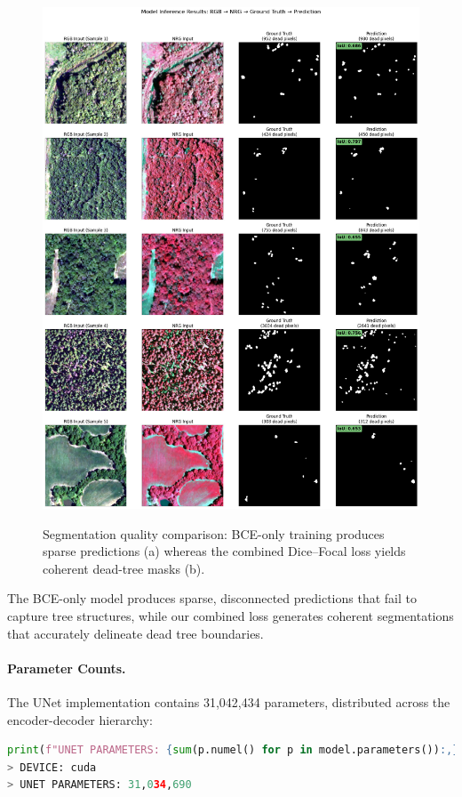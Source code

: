 \begin{figure}[htbp]
\begin{minipage}{0.47\linewidth}
    \includegraphics[width=0.9\linewidth]{figs/unet-good-result-grid.jpg}
    \label{fig:good}
  \end{minipage}
  \caption{Segmentation quality comparison: BCE-only training produces sparse predictions (a) whereas the combined Dice–Focal loss yields coherent dead-tree masks (b).}
  \label{fig:loss_comparison}
\end{figure}

The BCE-only model produces sparse, disconnected predictions that fail to capture tree structures, while our combined loss generates coherent segmentations that accurately delineate dead tree boundaries.

\paragraph{Parameter Counts.}
The UNet implementation contains 31,042,434 parameters, distributed across the encoder-decoder hierarchy:

\begin{lstlisting}[language=Python]
print(f"UNET PARAMETERS: {sum(p.numel() for p in model.parameters()):,}")
> DEVICE: cuda
> UNET PARAMETERS: 31,034,690
\end{lstlisting}

